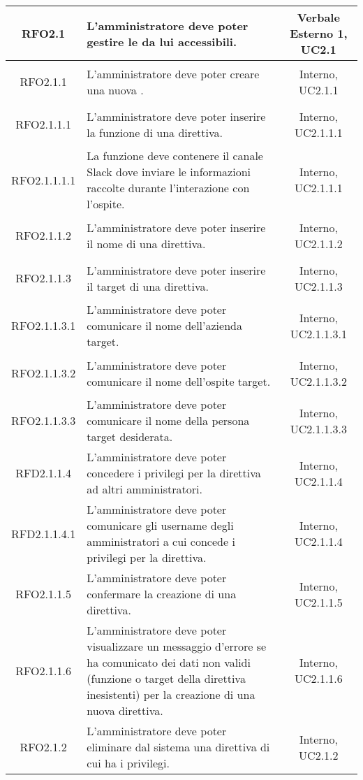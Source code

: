 \begin{longtable}{|c|>{\centering}m{7cm}|c|}
	\hypertarget{RFO2.1}{RFO2.1} & L'amministratore deve poter gestire le \gl{direttive} da lui accessibili. & Verbale Esterno 1, UC2.1\\ \hline
	\hypertarget{RFO2.1.1}{RFO2.1.1} & L'amministratore deve poter creare una nuova \gl{direttiva}. & Interno, UC2.1.1\\ \hline
	\hypertarget{RFO2.1.1.1}{RFO2.1.1.1} & L'amministratore deve poter inserire la funzione di una direttiva. & Interno, UC2.1.1.1\\ \hline
	\hypertarget{RFO2.1.1.1.1}{RFO2.1.1.1.1} & La funzione deve contenere il canale Slack dove inviare le informazioni raccolte durante l'interazione con l'ospite. & Interno, UC2.1.1.1\\ \hline
	\hypertarget{RFO2.1.1.2}{RFO2.1.1.2} & L'amministratore deve poter inserire il nome di una direttiva. & Interno, UC2.1.1.2\\ \hline
	\hypertarget{RFO2.1.1.3}{RFO2.1.1.3} & L'amministratore deve poter inserire il target di una direttiva. & Interno, UC2.1.1.3\\ \hline
	\hypertarget{RFO2.1.1.3.1}{RFO2.1.1.3.1} & L'amministratore deve poter comunicare il nome dell'azienda target. & Interno, UC2.1.1.3.1\\ \hline
	\hypertarget{RFO2.1.1.3.2}{RFO2.1.1.3.2} & L'amministratore deve poter comunicare il nome dell'ospite target. & Interno, UC2.1.1.3.2\\ \hline
	\hypertarget{RFO2.1.1.3.3}{RFO2.1.1.3.3} & L'amministratore deve poter comunicare il nome della persona target desiderata. & Interno, UC2.1.1.3.3\\ \hline
	\hypertarget{RFD2.1.1.4}{RFD2.1.1.4} & L'amministratore deve poter concedere i privilegi per la direttiva ad altri amministratori. & Interno, UC2.1.1.4\\ \hline
	\hypertarget{RFD2.1.1.4.1}{RFD2.1.1.4.1} & L'amministratore deve poter comunicare gli username degli amministratori a cui concede i privilegi per la direttiva. & Interno, UC2.1.1.4\\ \hline
	\hypertarget{RFO2.1.1.5}{RFO2.1.1.5} & L'amministratore deve poter confermare la creazione di una direttiva. & Interno, UC2.1.1.5\\ \hline
	\hypertarget{RFO2.1.1.6}{RFO2.1.1.6} & L'amministratore deve poter visualizzare un messaggio d'errore se ha comunicato dei dati non validi (funzione o target della direttiva inesistenti) per la creazione di una nuova direttiva. & Interno, UC2.1.1.6\\ \hline
	\hypertarget{RFO2.1.2}{RFO2.1.2} & L'amministratore deve poter eliminare dal sistema una direttiva di cui ha i privilegi. & Interno, UC2.1.2\\ \hline

\end{longtable}
